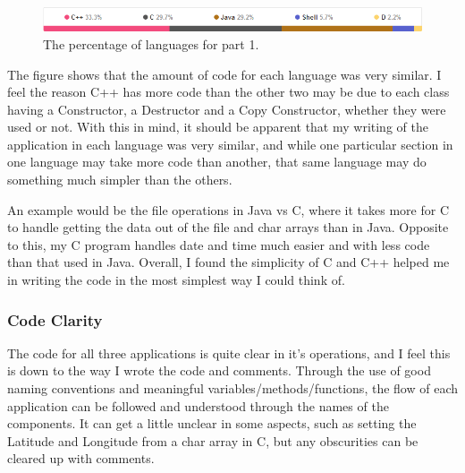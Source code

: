 \documentclass{article}
\begin{document}
\begin{figure}[h!]
  \centering
    \includegraphics[width=1\textwidth]{img/percentages}
  \caption{The percentage of languages for part 1.}
\end{figure}

The figure shows that the amount of code for each language was very similar. I feel the reason C++ has more code than the other two may be due to each class having a Constructor, a Destructor and a Copy Constructor, whether they were used or not. With this in mind, it should be apparent that my writing of the application in each language was very similar, and while one particular section in one language may take more code than another, that same language may do something much simpler than the others.

An example would be the file operations in Java vs C, where it takes more for C to handle getting the data out of the file and char arrays than in Java. Opposite to this, my C program handles date and time much easier and with less code than that used in Java. Overall, I found the simplicity of C and C++ helped me in writing the code in the most simplest way I could think of.

\subsubsection{Code Clarity}

The code for all three applications is quite clear in it's operations, and I feel this is down to the way I wrote the code and comments. Through the use of good naming conventions and meaningful variables/methods/functions, the flow of each application can be followed and understood through the names of the components. It can get a little unclear in some aspects, such as setting the Latitude and Longitude from a char array in C, but any obscurities can be cleared up with comments.
\end{document}

